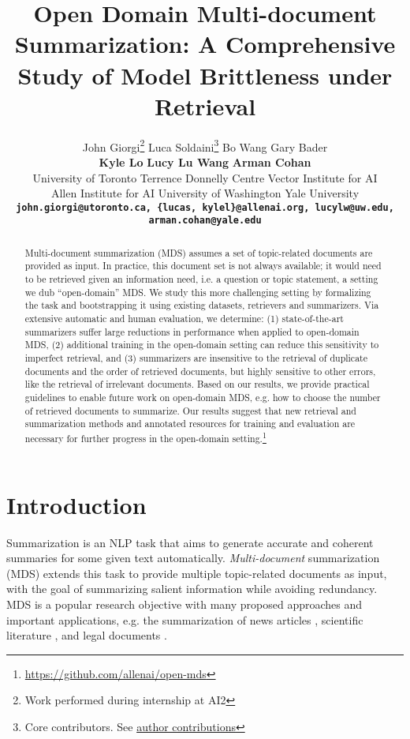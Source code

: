 \documentclass[11pt]{article}
\title{Open Domain Multi-document Summarization: A Comprehensive Study of Model Brittleness under Retrieval}
\author{
John Giorgi\thanks{\enspace Work performed during internship at AI2} \quad Luca Soldaini\thanks{\enspace Core contributors. See \hyperref[sec:contrib]{author contributions}} \quad Bo Wang \quad Gary Bader \\ \textbf{Kyle Lo} \quad \textbf{Lucy Lu Wang} \quad \textbf{Arman Cohan}\vspace{6pt}\\
  University of Toronto \quad
  Terrence Donnelly Centre \quad
  Vector Institute for AI \\
  Allen Institute for AI \quad
  University of Washington \quad Yale University\\
  {\footnotesize \bf\texttt{john.giorgi@utoronto.ca, \{lucas, kylel\}@allenai.org, lucylw@uw.edu, arman.cohan@yale.edu}}
}
\begin{document}
\maketitle
\begin{abstract}
Multi-document summarization (MDS) assumes a set of topic-related documents are provided as input. In practice, this document set is not always available; it would need to be retrieved given an information need, i.e. a question or topic statement, a setting we dub ``open-domain'' MDS. We study this more challenging setting by formalizing the task and bootstrapping it using existing datasets, retrievers and summarizers. Via extensive automatic and human evaluation, we determine: (1) state-of-the-art summarizers suffer large reductions in performance when applied to open-domain MDS, (2) additional training in the open-domain setting can reduce this sensitivity to imperfect retrieval, and (3) summarizers are insensitive to the retrieval of duplicate documents and the order of retrieved documents, but highly sensitive to other errors, like the retrieval of irrelevant documents. Based on our results, we provide practical guidelines to enable future work on open-domain MDS, e.g. how to choose the number of retrieved documents to summarize. Our results suggest that new retrieval and summarization methods and annotated resources for training and evaluation are necessary for further progress in the open-domain setting.\footnote{\label{footurl}\url{https://github.com/allenai/open-mds}}
\end{abstract}

\section{Introduction}

Summarization is an NLP task that aims to generate accurate and coherent summaries for some given text automatically. \textit{Multi-document} summarization (MDS) extends this task to provide multiple topic-related documents as input, with the goal of summarizing salient information while avoiding redundancy. MDS is a popular research objective with many proposed approaches \citep{yasunaga-etal-2017-graph, liao-etal-2018-abstract, liu-lapata-2019-hierarchical, li-etal-2020-leveraging-graph, jin-etal-2020-multi, mao-etal-2020-multi, pegasus, pasunuru-etal-2021-efficiently, xiao-etal-2022-primera} and important applications, e.g. the summarization of news articles \citep{fabbri-etal-2019-multi, gholipour-ghalandari-etal-2020-large}, scientific literature \citep{lu-etal-2020-multi-xscience, cochrane, deyoung-etal-2021-ms}, and legal documents \citep{multilexsum}.
\end{document}
